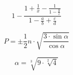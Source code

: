 \documentclass[a4paper,twoside,10 pt]{article}
\begin{document}
\begin{normalsize}
    $$1-\frac{1+\frac{1}{x}-\frac{1}{1-\frac{y}{z}}}{1-\frac{a}{b}+\frac{c}{d}}$$

    $$P=\pm \frac{1}{2} n\cdot\sqrt{\frac{3\cdot\sin \alpha}{\cos \alpha}}$$

    $$\alpha = \sqrt[3]{9\cdot\sqrt[2]{4}}$$
\end{normalsize}
\end{document}
